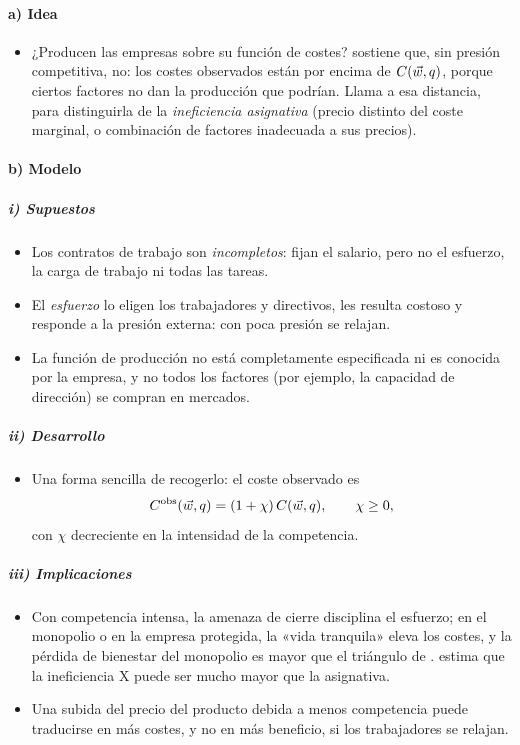 \documentclass[11pt]{article}
\begin{document}
\paragraph{a) Idea}

\begin{itemize}
\item ¿Producen las empresas sobre su función de costes? \textcite{Leibenstein1966Allocative} sostiene que, sin presión competitiva, no: los costes observados están por encima de $C(\vec{w},q)$, porque ciertos factores no dan la producción que podrían. Llama  a esa distancia, para distinguirla de la \emph{ineficiencia asignativa} (precio distinto del coste marginal, o combinación de factores inadecuada a sus precios).
\end{itemize}

\paragraph{b) Modelo}

\subparagraph{i) Supuestos}

\begin{itemize}
\item Los contratos de trabajo son \emph{incompletos}: fijan el salario, pero no el esfuerzo, la carga de trabajo ni todas las tareas.
\item El \emph{esfuerzo} lo eligen los trabajadores y directivos, les resulta costoso y responde a la presión externa: con poca presión se relajan.
\item La función de producción no está completamente especificada ni es conocida por la empresa, y no todos los factores (por ejemplo, la capacidad de dirección) se compran en mercados.
\end{itemize}

\subparagraph{ii) Desarrollo}

\begin{itemize}
\item Una forma sencilla de recogerlo: el coste observado es
  \begin{equation}
  C^{\mathrm{obs}}(\vec{w},q)=(1+\chi)\,C(\vec{w},q),\qquad \chi\geq 0, \label{eq:ineficiencia-x}
  \end{equation}
  con $\chi$ decreciente en la intensidad de la competencia.
\end{itemize}

\subparagraph{iii) Implicaciones}

\begin{itemize}
\item Con competencia intensa, la amenaza de cierre disciplina el esfuerzo; en el monopolio o en la empresa protegida, la «vida tranquila» eleva los costes, y la pérdida de bienestar del monopolio es mayor que el triángulo de  .  estima que la ineficiencia X puede ser mucho mayor que la asignativa\nocite{Leibenstein1982CitationClassic}.
\item Una subida del precio del producto debida a menos competencia puede traducirse en más costes, y no en más beneficio, si los trabajadores se relajan.
\end{itemize}
\end{document}
